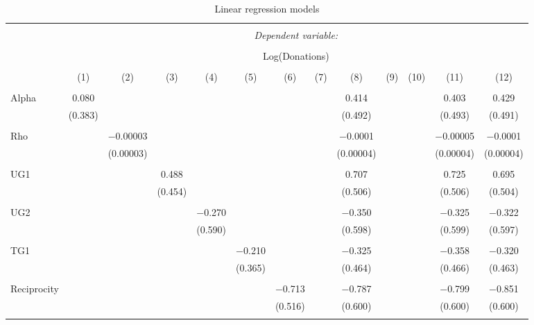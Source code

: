 \documentclass[12pt]{article}
\begin{document}
\begin{table}[!htbp] \centering 
  \caption{Linear regression models} 
  \label{} 
   \begin{adjustbox}{width=\textwidth}
\begin{tabular}{@{\extracolsep{5pt}}lcccccccccccc} 
\\[-1.8ex]\hline 
\hline \\[-1.8ex] 
 & \multicolumn{12}{c}{\textit{Dependent variable:}} \\ 
\cline{2-13} 
\\[-1.8ex] & \multicolumn{12}{c}{Log(Donations)} \\ 
\\[-1.8ex] & (1) & (2) & (3) & (4) & (5) & (6) & (7) & (8) & (9) & (10) & (11) & (12)\\ 
\hline \\[-1.8ex] 
 Alpha & 0.080 &  &  &  &  &  &  & 0.414 &  &  & 0.403 & 0.429 \\ 
  & (0.383) &  &  &  &  &  &  & (0.492) &  &  & (0.493) & (0.491) \\ 
  & & & & & & & & & & & & \\ 
 Rho &  & $-$0.00003 &  &  &  &  &  & $-$0.0001 &  &  & $-$0.00005 & $-$0.0001 \\ 
  &  & (0.00003) &  &  &  &  &  & (0.00004) &  &  & (0.00004) & (0.00004) \\ 
  & & & & & & & & & & & & \\ 
 UG1 &  &  & 0.488 &  &  &  &  & 0.707 &  &  & 0.725 & 0.695 \\ 
  &  &  & (0.454) &  &  &  &  & (0.506) &  &  & (0.506) & (0.504) \\ 
  & & & & & & & & & & & & \\ 
 UG2 &  &  &  & $-$0.270 &  &  &  & $-$0.350 &  &  & $-$0.325 & $-$0.322 \\ 
  &  &  &  & (0.590) &  &  &  & (0.598) &  &  & (0.599) & (0.597) \\ 
  & & & & & & & & & & & & \\ 
 TG1 &  &  &  &  & $-$0.210 &  &  & $-$0.325 &  &  & $-$0.358 & $-$0.320 \\ 
  &  &  &  &  & (0.365) &  &  & (0.464) &  &  & (0.466) & (0.463) \\ 
  & & & & & & & & & & & & \\ 
 Reciprocity &  &  &  &  &  & $-$0.713 &  & $-$0.787 &  &  & $-$0.799 & $-$0.851 \\ 
  &  &  &  &  &  & (0.516) &  & (0.600) &  &  & (0.600) & (0.600) \\ 
  & & & & & & & & & & & & \\ 

\end{tabular}
\end{adjustbox}
\end{table}
\end{document}

